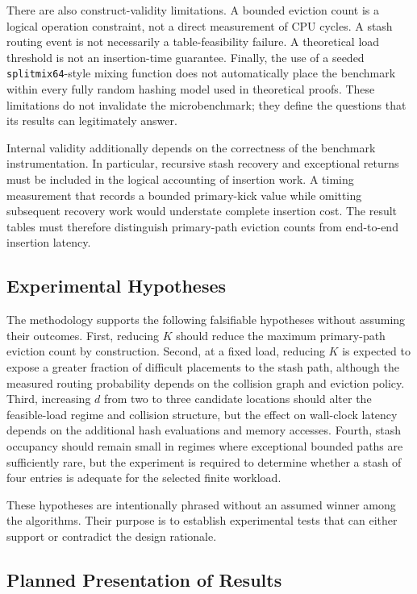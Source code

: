 \documentclass[conference]{IEEEtran}
\begin{document}
There are also construct-validity limitations. A bounded eviction count is a
logical operation constraint, not a direct measurement of CPU cycles. A stash
routing event is not necessarily a table-feasibility failure. A theoretical load
threshold is not an insertion-time guarantee. Finally, the use of a seeded
\texttt{splitmix64}-style mixing function does not automatically place the
benchmark within every fully random hashing model used in theoretical proofs.
These limitations do not invalidate the microbenchmark; they define the
questions that its results can legitimately answer.

Internal validity additionally depends on the correctness of the benchmark
instrumentation. In particular, recursive stash recovery and exceptional
returns must be included in the logical accounting of insertion work. A timing
measurement that records a bounded primary-kick value while omitting subsequent
recovery work would understate complete insertion cost. The result tables must
therefore distinguish primary-path eviction counts from end-to-end insertion
latency.

\subsection{Experimental Hypotheses}

The methodology supports the following falsifiable hypotheses without assuming
their outcomes. First, reducing $K$ should reduce the maximum primary-path
eviction count by construction. Second, at a fixed load, reducing $K$ is expected
to expose a greater fraction of difficult placements to the stash path, although
the measured routing probability depends on the collision graph and eviction
policy. Third, increasing $d$ from two to three candidate locations should alter
the feasible-load regime and collision structure, but the effect on wall-clock
latency depends on the additional hash evaluations and memory accesses. Fourth,
stash occupancy should remain small in regimes where exceptional bounded paths
are sufficiently rare, but the experiment is required to determine whether a
stash of four entries is adequate for the selected finite workload.

These hypotheses are intentionally phrased without an assumed winner among the
algorithms. Their purpose is to establish experimental tests that can either
support or contradict the design rationale.

\subsection{Planned Presentation of Results}
\end{document}
